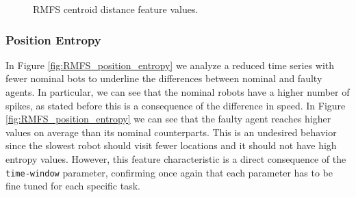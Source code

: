 \documentclass[../../Thesis.tex]{subfiles}
\begin{document}
\begin{figure}
{					}
					\caption{RMFS centroid distance feature values.}
					\label{fig:RMFS_centroid_distance}
				\end{figure}
				
			\subsubsection{Position Entropy}
				In Figure \ref{fig:RMFS_position_entropy} we analyze a reduced time series with fewer nominal bots to underline the differences between nominal and faulty agents. In particular, we can see that the nominal robots have a higher number of spikes, as stated before this is a consequence of the difference in speed. In Figure \ref{fig:RMFS_position_entropy} we can see that the faulty agent reaches higher values on average than its nominal counterparts. This is an undesired behavior since the slowest robot should visit fewer locations and it should not have high entropy values. However, this feature characteristic is a direct consequence of the \verb|time-window| parameter, confirming once again that each parameter has to be fine tuned for each specific task.
\end{document}
